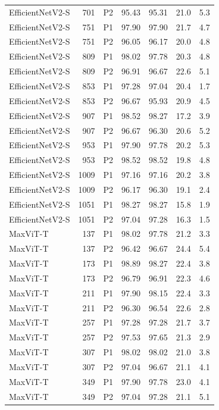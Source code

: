 {\begin{longtable}{lrlrrrr}
EfficientNetV2-S & 701 & P2 & 95.43 & 95.31 & 21.0 & 5.3 \\
EfficientNetV2-S & 751 & P1 & 97.90 & 97.90 & 21.7 & 4.7 \\
EfficientNetV2-S & 751 & P2 & 96.05 & 96.17 & 20.0 & 4.8 \\
EfficientNetV2-S & 809 & P1 & 98.02 & 97.78 & 20.3 & 4.8 \\
EfficientNetV2-S & 809 & P2 & 96.91 & 96.67 & 22.6 & 5.1 \\
EfficientNetV2-S & 853 & P1 & 97.28 & 97.04 & 20.4 & 1.7 \\
EfficientNetV2-S & 853 & P2 & 96.67 & 95.93 & 20.9 & 4.5 \\
EfficientNetV2-S & 907 & P1 & 98.52 & 98.27 & 17.2 & 3.9 \\
EfficientNetV2-S & 907 & P2 & 96.67 & 96.30 & 20.6 & 5.2 \\
EfficientNetV2-S & 953 & P1 & 97.90 & 97.78 & 20.2 & 5.3 \\
EfficientNetV2-S & 953 & P2 & 98.52 & 98.52 & 19.8 & 4.8 \\
EfficientNetV2-S & 1009 & P1 & 97.16 & 97.16 & 20.2 & 3.8 \\
EfficientNetV2-S & 1009 & P2 & 96.17 & 96.30 & 19.1 & 2.4 \\
EfficientNetV2-S & 1051 & P1 & 98.27 & 98.27 & 15.8 & 1.9 \\
EfficientNetV2-S & 1051 & P2 & 97.04 & 97.28 & 16.3 & 1.5 \\
MaxViT-T & 137 & P1 & 98.02 & 97.78 & 21.2 & 3.3 \\
MaxViT-T & 137 & P2 & 96.42 & 96.67 & 24.4 & 5.4 \\
MaxViT-T & 173 & P1 & 98.89 & 98.27 & 22.4 & 3.8 \\
MaxViT-T & 173 & P2 & 96.79 & 96.91 & 22.3 & 4.6 \\
MaxViT-T & 211 & P1 & 97.90 & 98.15 & 22.4 & 3.3 \\
MaxViT-T & 211 & P2 & 96.30 & 96.54 & 22.6 & 2.8 \\
MaxViT-T & 257 & P1 & 97.28 & 97.28 & 21.7 & 3.7 \\
MaxViT-T & 257 & P2 & 97.53 & 97.65 & 21.3 & 2.9 \\
MaxViT-T & 307 & P1 & 98.02 & 98.02 & 21.0 & 3.8 \\
MaxViT-T & 307 & P2 & 97.04 & 96.67 & 21.1 & 4.1 \\
MaxViT-T & 349 & P1 & 97.90 & 97.78 & 23.0 & 4.1 \\
MaxViT-T & 349 & P2 & 97.04 & 97.28 & 21.1 & 5.1 \\

\end{longtable}}
